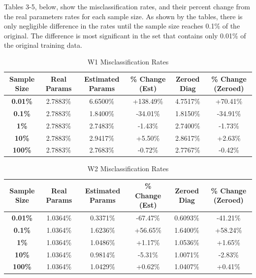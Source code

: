 \documentclass{article}
\begin{document}
\newpage
\noindent Tables 3-5, below, show the misclassification rates, and their percent change from the real parameters 
rates for each sample size. As shown by the tables, there is only negligible difference in the rates until the 
sample size reaches 0.1\% of the original. The difference is most significant in the set that contains only 0.01\% 
of the original training data.  

\begin{table}[H]
\centering
\small
\caption{W1 Misclassification Rates}
\vspace{0.5em}
\begin{tabular}{cccccc}
\toprule
\textbf{Sample Size} & \textbf{Real Params} & \textbf{Estimated Params} & \textbf{\% Change (Est)} & \textbf{Zeroed Diag} & \textbf{\% Change (Zeroed)} \\
\midrule
\textbf{0.01\%} & 2.7883\% & 6.6500\% & \cellcolor{greatworsened}\color{white} +138.49\% & 4.7517\% & \cellcolor{greatworsened}\color{white} +70.41\% \\
\textbf{0.1\%} & 2.7883\% & 1.8400\% & \cellcolor{greatimproved} -34.01\% & 1.8150\% & \cellcolor{greatimproved} -34.91\% \\
\textbf{1\%} & 2.7883\% & 2.7483\% & \cellcolor{improved} -1.43\% & 2.7400\% & \cellcolor{improved} -1.73\% \\
\textbf{10\%} & 2.7883\% & 2.9417\% & \cellcolor{greatworsened}\color{white} +5.50\% & 2.8617\% & \cellcolor{worsened} +2.63\% \\
\textbf{100\%} & 2.7883\% & 2.7683\% & \cellcolor{improved} -0.72\% & 2.7767\% & \cellcolor{negchange} -0.42\% \\
\bottomrule
\end{tabular}
\end{table}

\begin{table}[H]
\centering
\small
\caption{W2 Misclassification Rates}
\vspace{0.5em}
\begin{tabular}{cccccc}
\toprule
\textbf{Sample Size} & \textbf{Real Params} & \textbf{Estimated Params} & \textbf{\% Change (Est)} & \textbf{Zeroed Diag} & \textbf{\% Change (Zeroed)} \\
\midrule
\textbf{0.01\%} & 1.0364\% & 0.3371\% & \cellcolor{greatimproved} -67.47\% & 0.6093\% & \cellcolor{greatimproved} -41.21\% \\
\textbf{0.1\%} & 1.0364\% & 1.6236\% & \cellcolor{greatworsened}\color{white} +56.65\% & 1.6400\% & \cellcolor{greatworsened}\color{white} +58.24\% \\
\textbf{1\%} & 1.0364\% & 1.0486\% & \cellcolor{worsened} +1.17\% & 1.0536\% & \cellcolor{worsened} +1.65\% \\
\textbf{10\%} & 1.0364\% & 0.9814\% & \cellcolor{greatimproved} -5.31\% & 1.0071\% & \cellcolor{improved} -2.83\% \\
\textbf{100\%} & 1.0364\% & 1.0429\% & \cellcolor{worsened} +0.62\% & 1.0407\% & \cellcolor{negchange} +0.41\% \\
\bottomrule
\end{tabular}
\end{table}
\end{document}
